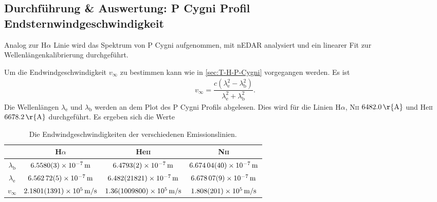 \subsection{Durchführung \& Auswertung: P Cygni Profil\\Endsternwindgeschwindigkeit}
Analog zur H$\alpha $ Linie wird das Spektrum von P Cygni aufgenommen, mit nEDAR analysiert und ein linearer Fit zur Wellenlängenkalibrierung durchgeführt.

Um die Endwindgeschwindigkeit $v_\infty$ zu bestimmen kann wie in \ref{sec:T-H-P-Cygni} vorgegangen werden.
Es ist
\begin{align} 
  v_\infty=\dfrac{c\left(\lambda _\text{e}^2-\lambda _\text{b}^2\right)}{\lambda _\text{e}^2+\lambda _\text{b}^2}
.\end{align} 
Die Wellenlängen $\lambda _\text{e}$ und $\lambda _\text{b}$ werden an dem Plot des P Cygni Profils abgelesen.
Dies wird für die Linien H$\alpha$, N\textsc{ii} $\SI{6482,0}{\r{A}}$ und He\textsc{ii} $\SI{6678,2}{\r{A}}$ durchgeführt.  
Es ergeben sich die Werte
\begin{table}[h]
  \begin{tabular}{cccc}
    \toprule
    & H$\alpha$ & He\textsc{ii} & N\textsc{ii}\\
    \midrule
    $\lambda _\text{b}$ & $\SI{6.5580+-0.0003e-7}{m}$ & $\SI{6.4793+-0.0002e-7}{m}$ & $\SI{6.67404+-0.0004e-7}{m}$ \\
    $\lambda _\text{e}$ & $\SI{6.56272+-0.00005e-7}{m}$ & $\SI{6.482+-21.821e-7}{m}$ & $\SI{6.67807+-0.00009e-7}{m}$ \\
    $v_\infty$ & $\SI{2.1801+-0.1391e+5}{m/s}$ & $\SI{1.36+-10098e+5}{m/s}$ & $\SI{1.808+-0.201e+5}{m/s}$ \\
    \bottomrule
  \end{tabular}
  \caption{Die Endwindgeschwindigkeiten der verschiedenen Emissionslinien.} \label{tab:vinf}
\end{table}
